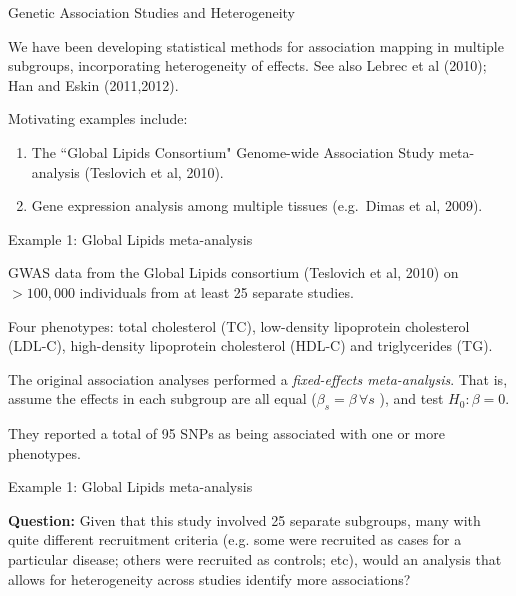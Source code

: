 \documentclass[ignorenonframetext]{beamer}
\begin{document}
\begin{frame}{Genetic Association Studies and Heterogeneity}  

We have been developing statistical methods for association mapping in multiple subgroups, incorporating heterogeneity of effects.
See also Lebrec et al (2010); Han and Eskin (2011,2012). 
\bigskip

Motivating examples include:
\begin{enumerate}
 \item The ``Global Lipids Consortium" Genome-wide Association Study meta-analysis (Teslovich et al, 2010).
 \item Gene expression analysis among multiple tissues (e.g.~Dimas et al, 2009).
 \end{enumerate}
\end{frame}


 \begin{frame}{Example 1: Global Lipids meta-analysis}
 
GWAS data from the Global Lipids consortium (Teslovich et al, 2010) on $>100,000$ individuals
from at least 25 separate studies.

\bigskip 
Four phenotypes: total cholesterol (TC), low-density lipoprotein cholesterol
(LDL-C), high-density lipoprotein cholesterol (HDL-C) and triglycerides (TG).

\bigskip
The original association analyses performed a {\it fixed-effects meta-analysis}.
That is, assume the effects in each subgroup  are all equal ($\beta_s = \beta \, \forall s$ ), and test $H_0: \beta=0$. 

\bigskip
They reported a total of 95
SNPs as being associated with one or more phenotypes.

\end{frame}

\begin{frame}{Example 1: Global Lipids meta-analysis}

{\bf Question:} Given that this study involved 25 separate subgroups, many with quite different recruitment criteria
(e.g. some were recruited as cases for a particular disease; others were recruited as controls; etc),
would an analysis that allows for heterogeneity across studies identify more associations?
 \end{frame}
 
\end{document}
